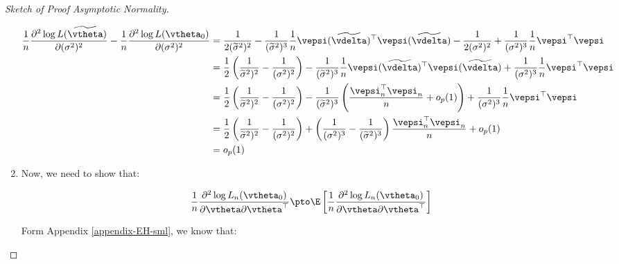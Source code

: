 \documentclass[english,12pt]{book}\usepackage[]{graphicx}\usepackage[]{xcolor}
\begin{document}
\begin{proof}[Sketch of Proof Asymptotic Normality]
\begin{enumerate}
   \begin{equation*}
    \begin{aligned}
      \frac{1}{n}\frac{\partial^2 \log L(\widetilde{\vtheta})}{\partial (\sigma^2)^2} -	\frac{1}{n}\frac{\partial^2 \log L(\vtheta_0)}{\partial (\sigma^2)^2}  & = \frac{1}{2(\widetilde{\sigma}^2) ^2} - \frac{1}{(\widetilde{\sigma}^2)^3} \frac{1}{n}\vepsi(\widetilde{\vdelta})^\top \vepsi(\widetilde{\vdelta}) -\frac{1}{2(\sigma^2) ^2} + \frac{1}{(\sigma^2)^3} \frac{1}{n}\vepsi^\top \vepsi \\
      & = \frac{1}{2}\left(\frac{1}{\widetilde{\sigma}^2) ^2}-\frac{1}{(\sigma^2) ^2}\right)- \frac{1}{(\widetilde{\sigma}^2)^3} \frac{1}{n}\vepsi(\widetilde{\vdelta})^\top \vepsi(\widetilde{\vdelta}) + \frac{1}{(\sigma^2)^3} \frac{1}{n}\vepsi^\top \vepsi \\
      & = \frac{1}{2}\left(\frac{1}{\widetilde{\sigma}^2) ^2}-\frac{1}{(\sigma^2) ^2}\right)- \frac{1}{(\widetilde{\sigma}^2)^3} \left(\frac{\vepsi_n^{\top}\vepsi_n}{n} + o_p(1)\right)+ \frac{1}{(\sigma^2)^3} \frac{1}{n}\vepsi^\top \vepsi \\
      & = \frac{1}{2}\left(\frac{1}{\widetilde{\sigma}^2) ^2}-\frac{1}{(\sigma^2) ^2}\right)+ \left(\frac{1}{(\sigma^2)^3} -\frac{1}{(\widetilde{\sigma}^2)^3}\right)\frac{\vepsi_n^{\top}\vepsi_n}{n} + o_p(1) \\
      & = o_p(1)
    \end{aligned}
   \end{equation*}
   

   
   \item Now, we need to show that:
   
   \begin{equation}
     \frac{1}{n}\frac{\partial^2 \log L_n(\vtheta_0)}{\partial \vtheta \partial \vtheta^\top}\pto \E\left[\frac{1}{n}\frac{\partial^2 \log L_n(\vtheta_0)}{\partial \vtheta \partial \vtheta^\top}\right]
   \end{equation}
   
   Form Appendix \ref{appendix-EH-sml}, we know that:
   

\end{enumerate}
\end{proof}
\end{document}
